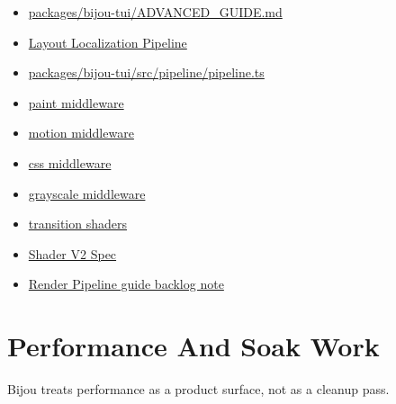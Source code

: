 \begin{itemize}
\tightlist
\item
  \href{https://github.com/flyingrobots/bijou/blob/cbd70612140e7a450d764b3c7be1c6af878b99bc/packages/bijou-tui/ADVANCED_GUIDE.md}{packages/bijou-tui/ADVANCED\_GUIDE.md}
\item
  \href{https://github.com/flyingrobots/bijou/blob/cbd70612140e7a450d764b3c7be1c6af878b99bc/docs/strategy/layout-localization-pipeline.md}{Layout Localization Pipeline}
\item
  \href{https://github.com/flyingrobots/bijou/blob/cbd70612140e7a450d764b3c7be1c6af878b99bc/packages/bijou-tui/src/pipeline/pipeline.ts}{packages/bijou-tui/src/pipeline/pipeline.ts}
\item
  \href{https://github.com/flyingrobots/bijou/blob/cbd70612140e7a450d764b3c7be1c6af878b99bc/packages/bijou-tui/src/pipeline/middleware/paint.ts}{paint middleware}
\item
  \href{https://github.com/flyingrobots/bijou/blob/cbd70612140e7a450d764b3c7be1c6af878b99bc/packages/bijou-tui/src/pipeline/middleware/motion.ts}{motion middleware}
\item
  \href{https://github.com/flyingrobots/bijou/blob/cbd70612140e7a450d764b3c7be1c6af878b99bc/packages/bijou-tui/src/pipeline/middleware/css.ts}{css middleware}
\item
  \href{https://github.com/flyingrobots/bijou/blob/cbd70612140e7a450d764b3c7be1c6af878b99bc/packages/bijou-tui/src/pipeline/middleware/grayscale.ts}{grayscale middleware}
\item
  \href{https://github.com/flyingrobots/bijou/blob/cbd70612140e7a450d764b3c7be1c6af878b99bc/packages/bijou-tui/src/transition-shaders.ts}{transition shaders}
\item
  \href{https://github.com/flyingrobots/bijou/blob/cbd70612140e7a450d764b3c7be1c6af878b99bc/docs/specs/shader-v2.spec.json}{Shader V2 Spec}
\item
  \href{https://github.com/flyingrobots/bijou/blob/cbd70612140e7a450d764b3c7be1c6af878b99bc/docs/BACKLOG/inbox/DX-008-render-pipeline-guide.md}{Render Pipeline guide backlog note}
\end{itemize}

\section{Performance And Soak Work}\label{record-001-performance-and-soak-work}

Bijou treats performance as a product surface, not as a cleanup pass.

